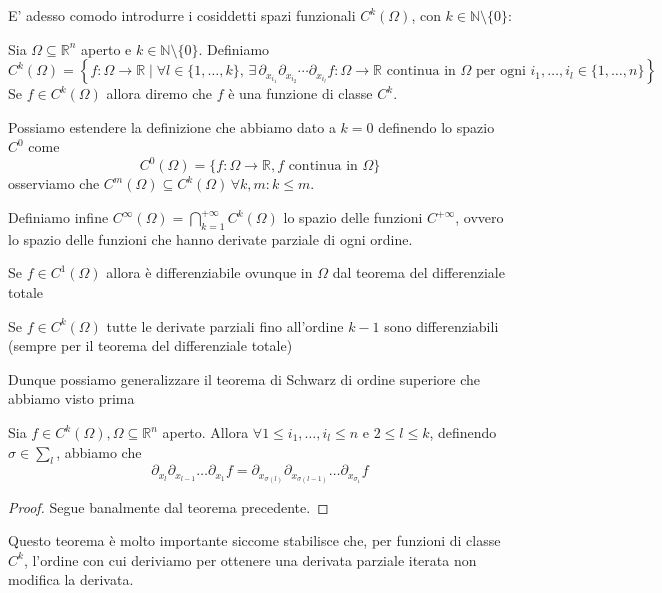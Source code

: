 \documentclass[openany, italian]{book}
\begin{document}
E' adesso comodo introdurre i cosiddetti spazi funzionali $C^k(\Omega)$, con $k \in \mathbb{N} \setminus \{ 0 \}$:
\begin{definition}[spazio $C^k$]
Sia $\Omega \subseteq \mathbb{R}^n$ aperto e $k \in \mathbb{N} \setminus \{ 0 \}$. Definiamo
$$
C^k(\Omega) = \left\{ f: \Omega \to \mathbb{R} \mid \forall l \in \{1, \ldots, k\}, \, \exists \, \partial_{x_{i_1}} \partial_{x_{i_2}} \cdots \partial_{x_{i_l}} f: \Omega \to \mathbb{R} \text{ continua in } \Omega \text{ per ogni } i_1, \ldots, i_l \in \{1, \ldots, n\} \right\}
$$
Se $f \in C^{k}(\Omega)$ allora diremo che $f$ è una funzione di classe $C^k$.
\end{definition}
\begin{remark}
Possiamo estendere la definizione che abbiamo dato a $k=0$ definendo lo spazio $C^{0}$ come
$$
C^{0}(\Omega) = \{f: \Omega \to \mathbb{R}, f \text{ continua in } \Omega \}
$$
osserviamo che $C^{m}(\Omega) \subseteq C^{k}(\Omega) \, \forall k, m : k \leq m$.
\end{remark}
Definiamo infine $C^{\infty}(\Omega) = \bigcap\limits^{+\infty}_{k=1} C^{k}(\Omega)$ lo spazio delle funzioni $C^{+\infty}$, ovvero lo spazio delle funzioni che hanno derivate parziale di ogni ordine.
\begin{remark}
Se $f \in C^1 (\Omega)$ allora è differenziabile ovunque in $\Omega$ dal teorema del differenziale totale
\end{remark}
\begin{remark}
Se $f \in C^{k} (\Omega)$ tutte le derivate parziali fino all'ordine $k-1$ sono differenziabili (sempre per il teorema del differenziale totale)
\end{remark}
Dunque possiamo generalizzare il teorema di Schwarz di ordine superiore che abbiamo visto prima
\begin{theorem}
Sia $f \in C^k(\Omega), \Omega \subseteq \mathbb{R}^n$ aperto. Allora $\forall 1 \leq i_1, \ldots, i_l \leq n$ e $2 \leq l \leq k$, definendo $\sigma \in \sum_{l}$, abbiamo che
$$
\partial_{x_l} \partial_{x_{l-1}} \ldots \partial_{x_1} f = \partial_{x_{\sigma(l)}} \partial_{x_{\sigma(l-1)}} \ldots \partial_{x_{\sigma_{1}}} f
$$
\end{theorem}
\begin{proof}
Segue banalmente dal teorema precedente.
\end{proof}
Questo teorema è molto importante siccome stabilisce che, per funzioni di classe $C^k$, l'ordine con cui deriviamo per ottenere una derivata parziale iterata non modifica la derivata. \\
\end{document}
